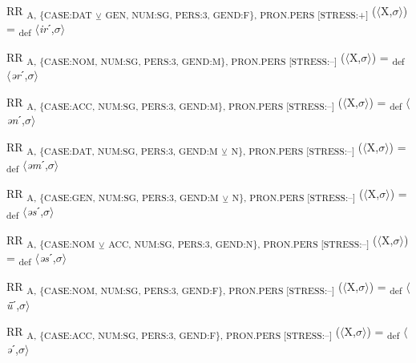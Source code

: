 {\begin{exe}
 RR \textsubscript{A, \{CASE:DAT} \textsubscript{${\veebar}$}\textsubscript{ GEN, NUM:SG, PERS:3, GEND:F\}, PRON.PERS [STRESS:+]} ($\langle$X,$\sigma $$\rangle$) = \textsubscript{def} $\langle$\textit{ir}ˊ,$\sigma $$\rangle$
\end{exe}

\begin{exe}
 RR \textsubscript{A, \{CASE:NOM, NUM:SG, PERS:3, GEND:M\}, PRON.PERS [STRESS:–]} ($\langle$X,$\sigma $$\rangle$) = \textsubscript{def} $\langle$\textit{ər}ˊ,$\sigma $$\rangle$
\end{exe}

\begin{exe}
 RR \textsubscript{A, \{CASE:ACC, NUM:SG, PERS:3, GEND:M\}, PRON.PERS [STRESS:–]} ($\langle$X,$\sigma $$\rangle$) = \textsubscript{def} $\langle$\textit{ən}ˊ,$\sigma $$\rangle$
\end{exe}

\begin{exe}
 RR \textsubscript{A, \{CASE:DAT, NUM:SG, PERS:3, GEND:M} \textsubscript{${\veebar}$}\textsubscript{ N\}, PRON.PERS [STRESS:–]} ($\langle$X,$\sigma $$\rangle$) = \textsubscript{def} $\langle$\textit{əm}ˊ,$\sigma $$\rangle$
\end{exe}

\begin{exe}
 RR \textsubscript{A, \{CASE:GEN, NUM:SG, PERS:3, GEND:M} \textsubscript{${\veebar}$}\textsubscript{ N\}, PRON.PERS [STRESS:–]} ($\langle$X,$\sigma $$\rangle$) = \textsubscript{def} $\langle$\textit{əs}ˊ,$\sigma $$\rangle$
\end{exe}

\begin{exe}
 RR \textsubscript{A, \{CASE:NOM} \textsubscript{${\veebar}$}\textsubscript{ ACC, NUM:SG, PERS:3, GEND:N\}, PRON.PERS [STRESS:–]} ($\langle$X,$\sigma $$\rangle$) = \textsubscript{def} $\langle$\textit{əs}ˊ,$\sigma $$\rangle$
\end{exe}

\begin{exe}
 RR \textsubscript{A, \{CASE:NOM, NUM:SG, PERS:3, GEND:F\}, PRON.PERS [STRESS:–]} ($\langle$X,$\sigma $$\rangle$) = \textsubscript{def} $\langle$\textit{ǖ}ˊ,$\sigma $$\rangle$
\end{exe}

\begin{exe}
 RR \textsubscript{A, \{CASE:ACC, NUM:SG, PERS:3, GEND:F\}, PRON.PERS [STRESS:–]} ($\langle$X,$\sigma $$\rangle$) = \textsubscript{def} $\langle$\textit{ə}ˊ,$\sigma $$\rangle$
\end{exe}

}
